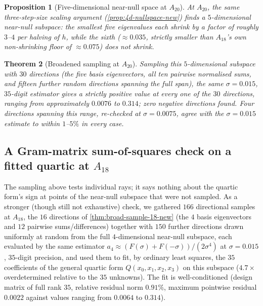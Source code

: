 \documentclass[11pt,reqno]{amsart}
\renewcommand{\_}{\origunderscore\allowbreak}
\numberwithin{equation}{section}
\theoremstyle{plain}
\newtheorem{thm}{Theorem}[section]
\newtheorem{prop}[thm]{Proposition}
\theoremstyle{definition}
\theoremstyle{remark}
\begin{document}
\begin{prop}[Five-dimensional near-null space at $A_{20}$]\label{prop:5d-nullspace-new}
At $A_{20}$, the same three-step-size scaling argument
(\cref{prop:4d-nullspace-new}) finds a $5$-dimensional near-null
subspace: the smallest five eigenvalues each shrink by a factor of
roughly $3$--$4$ per halving of $h$, while the sixth ($\approx0.035$,
strictly smaller than $A_{18}$'s own non-shrinking floor of
$\approx0.075$) does not shrink.
\end{prop}

\begin{thm}[Broadened sampling at $A_{20}$]\label{thm:broad-sample-20-new}
Sampling this $5$-dimensional subspace with $30$ directions (the five
basis eigenvectors, all ten pairwise normalised sums, and fifteen
further random directions spanning the full span), the same
$\sigma=0.015$, $35$-digit estimator gives a strictly positive value at
every one of the $30$ directions, ranging from approximately $0.0076$
to $0.314$; zero negative directions found. Four directions spanning
this range, re-checked at $\sigma=0.0075$, agree with the
$\sigma=0.015$ estimate to within $1$--$5\%$ in every case.
\end{thm}

\subsection{A Gram-matrix sum-of-squares check on a fitted quartic at $A_{18}$}\label{sec:gram-sos-A18}

The sampling above tests individual rays; it says nothing about the
quartic form's sign at points of the near-null subspace that were not
sampled. As a stronger (though still not exhaustive) check, we
gathered $166$ directional samples at $A_{18}$, the $16$ directions of
\cref{thm:broad-sample-18-new} (the $4$ basis eigenvectors and $12$
pairwise sums/differences) together with $150$ further directions drawn
uniformly at random from the full $4$-dimensional near-null subspace,
each evaluated by the same estimator $a_4\approx (F(\sigma)+F(-\sigma))/(2\sigma^4)$
at $\sigma=0.015$, $35$-digit precision, and used them to fit, by
ordinary least squares, the $35$ coefficients of the general quartic
form $Q(x_0,x_1,x_2,x_3)$ on this subspace ($4.7\times$ overdetermined
relative to the $35$ unknowns). The fit is well-conditioned (design
matrix of full rank $35$, relative residual norm $0.91\%$, maximum
pointwise residual $0.0022$ against values ranging from $0.0064$ to
$0.314$).
\end{document}
